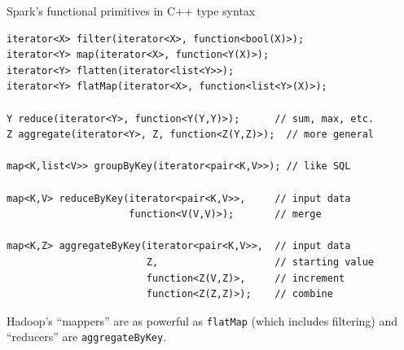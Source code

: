 \documentclass{beamer}
\begin{document}
\begin{frame}[fragile]{Spark's functional primitives in C++ type syntax}
\small
\begin{verbatim}
iterator<X> filter(iterator<X>, function<bool(X)>);
iterator<Y> map(iterator<X>, function<Y(X)>);
iterator<Y> flatten(iterator<list<Y>>);
iterator<Y> flatMap(iterator<X>, function<list<Y>(X)>);

Y reduce(iterator<Y>, function<Y(Y,Y)>);      // sum, max, etc.
Z aggregate(iterator<Y>, Z, function<Z(Y,Z)>);  // more general

map<K,list<V>> groupByKey(iterator<pair<K,V>>); // like SQL

map<K,V> reduceByKey(iterator<pair<K,V>>,     // input data
                     function<V(V,V)>);       // merge

map<K,Z> aggregateByKey(iterator<pair<K,V>>,  // input data
                        Z,                    // starting value
                        function<Z(V,Z)>,     // increment
                        function<Z(Z,Z)>);    // combine
\end{verbatim}

\normalsize
Hadoop's ``mappers'' are as powerful as {\tt flatMap} (which includes filtering) and ``reducers'' are {\tt aggregateByKey}.
\end{frame}
\end{document}

